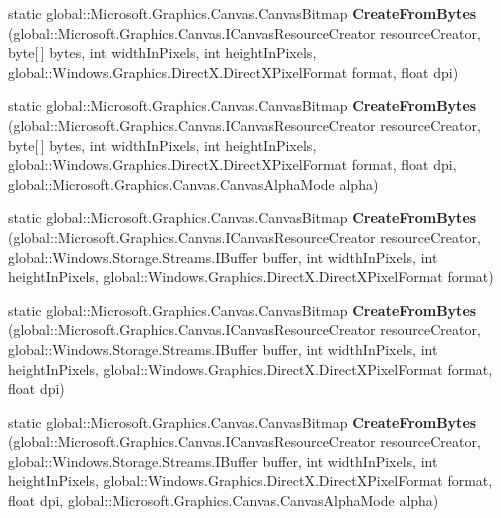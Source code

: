 \begin{DoxyCompactItemize}
static global\+::\+Microsoft.\+Graphics.\+Canvas.\+Canvas\+Bitmap {\bfseries Create\+From\+Bytes} (global\+::\+Microsoft.\+Graphics.\+Canvas.\+I\+Canvas\+Resource\+Creator resource\+Creator, byte\mbox{[}$\,$\mbox{]} bytes, int width\+In\+Pixels, int height\+In\+Pixels, global\+::\+Windows.\+Graphics.\+Direct\+X.\+Direct\+X\+Pixel\+Format format, float dpi)
\item 
\mbox{\label{class_microsoft_1_1_graphics_1_1_canvas_1_1_canvas_bitmap_a9681e1d684ee6e674d7512d2874c8f1b}} 
static global\+::\+Microsoft.\+Graphics.\+Canvas.\+Canvas\+Bitmap {\bfseries Create\+From\+Bytes} (global\+::\+Microsoft.\+Graphics.\+Canvas.\+I\+Canvas\+Resource\+Creator resource\+Creator, byte\mbox{[}$\,$\mbox{]} bytes, int width\+In\+Pixels, int height\+In\+Pixels, global\+::\+Windows.\+Graphics.\+Direct\+X.\+Direct\+X\+Pixel\+Format format, float dpi, global\+::\+Microsoft.\+Graphics.\+Canvas.\+Canvas\+Alpha\+Mode alpha)
\item 
\mbox{\label{class_microsoft_1_1_graphics_1_1_canvas_1_1_canvas_bitmap_a2168a3d89e47f661342d1550456b8f68}} 
static global\+::\+Microsoft.\+Graphics.\+Canvas.\+Canvas\+Bitmap {\bfseries Create\+From\+Bytes} (global\+::\+Microsoft.\+Graphics.\+Canvas.\+I\+Canvas\+Resource\+Creator resource\+Creator, global\+::\+Windows.\+Storage.\+Streams.\+I\+Buffer buffer, int width\+In\+Pixels, int height\+In\+Pixels, global\+::\+Windows.\+Graphics.\+Direct\+X.\+Direct\+X\+Pixel\+Format format)
\item 
\mbox{\label{class_microsoft_1_1_graphics_1_1_canvas_1_1_canvas_bitmap_af1daa19ada592de34b02ac1e97e88606}} 
static global\+::\+Microsoft.\+Graphics.\+Canvas.\+Canvas\+Bitmap {\bfseries Create\+From\+Bytes} (global\+::\+Microsoft.\+Graphics.\+Canvas.\+I\+Canvas\+Resource\+Creator resource\+Creator, global\+::\+Windows.\+Storage.\+Streams.\+I\+Buffer buffer, int width\+In\+Pixels, int height\+In\+Pixels, global\+::\+Windows.\+Graphics.\+Direct\+X.\+Direct\+X\+Pixel\+Format format, float dpi)
\item 
\mbox{\label{class_microsoft_1_1_graphics_1_1_canvas_1_1_canvas_bitmap_a86cbc0abd68451ea818e39d8079e60c9}} 
static global\+::\+Microsoft.\+Graphics.\+Canvas.\+Canvas\+Bitmap {\bfseries Create\+From\+Bytes} (global\+::\+Microsoft.\+Graphics.\+Canvas.\+I\+Canvas\+Resource\+Creator resource\+Creator, global\+::\+Windows.\+Storage.\+Streams.\+I\+Buffer buffer, int width\+In\+Pixels, int height\+In\+Pixels, global\+::\+Windows.\+Graphics.\+Direct\+X.\+Direct\+X\+Pixel\+Format format, float dpi, global\+::\+Microsoft.\+Graphics.\+Canvas.\+Canvas\+Alpha\+Mode alpha)

\end{DoxyCompactItemize}
